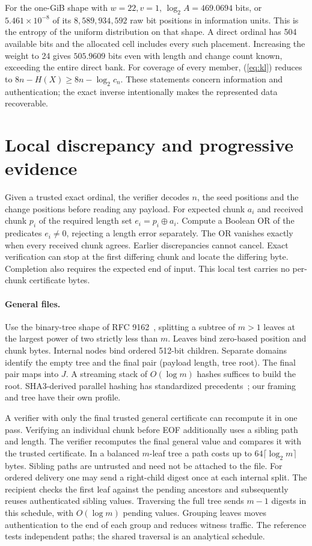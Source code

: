 \documentclass[10pt,twocolumn,letterpaper]{article}
\newcommand{\xor}{\mathbin\oplus}
\begin{document}
For the one-GiB shape with \(w=22,v=1\), \(\log_2 A=469.0694\) bits, or \(5.461\times10^{-8}\) of its \(8{,}589{,}934{,}592\) raw bit positions in information units. This is the entropy of the uniform distribution on that shape. A direct ordinal has 504 available bits and the allocated cell includes every such placement. Increasing the weight to 24 gives \(505.9609\) bits even with length and change count known, exceeding the entire direct bank. For coverage of every member, (\ref{eq:kl}) reduces to \(8n-H(X)\ge 8n-\log_2 c_n\). These statements concern information and authentication; the exact inverse intentionally makes the represented data recoverable.

\section{Local discrepancy and progressive evidence}
Given a trusted exact ordinal, the verifier decodes \(n\), the seed positions and the change positions before reading any payload. For expected chunk \(a_i\) and received chunk \(p_i\) of the required length set \(e_i=p_i\xor a_i\). Compute a Boolean OR of the predicates \(e_i\ne0\), rejecting a length error separately. The OR vanishes exactly when every received chunk agrees. Earlier discrepancies cannot cancel. Exact verification can stop at the first differing chunk and locate the differing byte. Completion also requires the expected end of input. This local test carries no per-chunk certificate bytes.

\paragraph{General files.}\label{sec:tree}
Use the binary-tree shape of RFC 9162~\cite{rfc}, splitting a subtree of \(m>1\) leaves at the largest power of two strictly less than \(m\). Leaves bind zero-based position and chunk bytes. Internal nodes bind ordered 512-bit children. Separate domains identify the empty tree and the final pair (payload length, tree root). The final pair maps into \(J\). A streaming stack of \(O(\log m)\) hashes suffices to build the root. SHA3-derived parallel hashing has standardized precedents~\cite{sp185}; our framing and tree have their own profile.

A verifier with only the final trusted general certificate can recompute it in one pass. Verifying an individual chunk before EOF additionally uses a sibling path and length. The verifier recomputes the final general value and compares it with the trusted certificate. In a balanced \(m\)-leaf tree a path costs up to \(64\lceil\log_2m\rceil\) bytes. Sibling paths are untrusted and need not be attached to the file. For ordered delivery one may send a right-child digest once at each internal split. The recipient checks the first leaf against the pending ancestors and subsequently reuses authenticated sibling values. Traversing the full tree sends \(m-1\) digests in this schedule, with \(O(\log m)\) pending values. Grouping leaves moves authentication to the end of each group and reduces witness traffic. The reference tests independent paths; the shared traversal is an analytical schedule.
\end{document}
